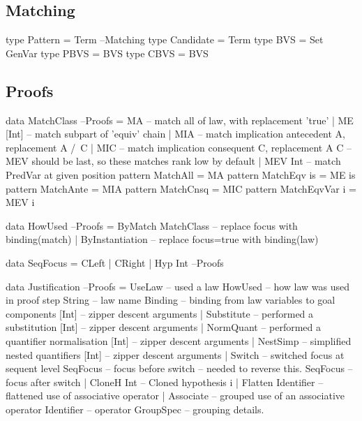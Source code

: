 \subsection{Matching}

\begin{code}
type Pattern = Term                                                 --Matching
type Candidate = Term
type BVS = Set GenVar
type PBVS = BVS
type CBVS = BVS
\end{code}


\subsection{Proofs}

\begin{code}
data MatchClass                                                       --Proofs
  = MA       -- match all of law, with replacement 'true'
  | ME [Int] -- match subpart of 'equiv' chain
  | MIA      -- match implication antecedent A, replacement A /\ C
  | MIC      -- match implication consequent C, replacement A \/ C
  -- MEV should be last, so these matches rank low by default
  | MEV Int  -- match PredVar at given position
pattern MatchAll       = MA
pattern MatchEqv is    = ME is
pattern MatchAnte      = MIA
pattern MatchCnsq      = MIC
pattern MatchEqvVar i  = MEV i
\end{code}

\begin{code}
data HowUsed                                                          --Proofs
  = ByMatch MatchClass  -- replace focus with binding(match)
  | ByInstantiation     -- replace focus=true with binding(law)
\end{code}

\begin{code}
data SeqFocus = CLeft | CRight | Hyp Int                              --Proofs
\end{code}

\newpage
\begin{code}
data Justification                                                    --Proofs
  = UseLaw             -- used a law
      HowUsed              -- how law was used in proof step
      String               -- law name
      Binding              -- binding from law variables to goal components
      [Int]                -- zipper descent arguments
  | Substitute         -- performed a substitution
      [Int]                -- zipper descent arguments
  | NormQuant          -- performed a quantifier normalisation
      [Int]                -- zipper descent arguments
  | NestSimp           -- simplified nested quantifiers
      [Int]                -- zipper descent arguments
  | Switch             -- switched focus at sequent level
      SeqFocus             -- focus before switch -- needed to reverse this.
      SeqFocus             -- focus after switch
  | CloneH Int         --  Cloned hypothesis i
  | Flatten Identifier -- flattened use of associative operator
  | Associate          -- grouped use of an associative operator
      Identifier           -- operator
      GroupSpec            -- grouping details.
\end{code}

